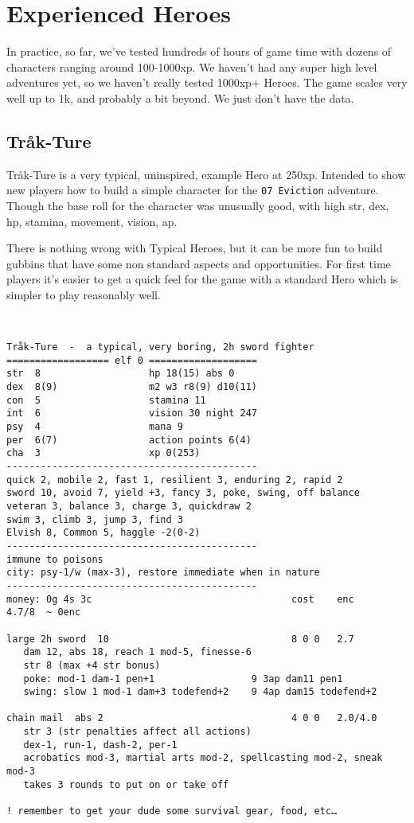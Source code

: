 \clearpage
{}
\section*{Experienced Heroes}
In practice, so far, we've tested hundreds of hours of game time with dozens of characters ranging around 100-1000xp. We haven't had any super high level adventures yet, so we haven't really tested 1000xp+ Heroes. The game scales very well up to 1k, and probably a bit beyond. We just don't have the data.


\subsection*{Tråk-Ture}
Tråk-Ture is a very typical, uninspired, example Hero at 250xp. Intended to show new players how to build a simple character for the \texttt{07 Eviction} adventure. Though the base roll for the character was unusually good, with high str, dex, hp, stamina, movement, vision, ap.

There is nothing wrong with Typical Heroes, but it can be more fun to build gubbins that have some non standard aspects and opportunities. For first time players it's easier to get a quick feel for the game with a standard Hero which is simpler to play reasonably well.

\

\small \begin{verbatim}
Tråk-Ture  -  a typical, very boring, 2h sword fighter
================== elf 0 ===================
str  8                   hp 18(15) abs 0
dex  8(9)                m2 w3 r8(9) d10(11)
con  5                   stamina 11
int  6                   vision 30 night 247
psy  4                   mana 9
per  6(7)                action points 6(4)
cha  3                   xp 0(253)
--------------------------------------------
quick 2, mobile 2, fast 1, resilient 3, enduring 2, rapid 2
sword 10, avoid 7, yield +3, fancy 3, poke, swing, off balance
veteran 3, balance 3, charge 3, quickdraw 2
swim 3, climb 3, jump 3, find 3
Elvish 8, Common 5, haggle -2(0-2)
--------------------------------------------
immune to poisons
city: psy-1/w (max-3), restore immediate when in nature
--------------------------------------------
money: 0g 4s 3c                                   cost    enc      4.7/8  ~ 0enc

large 2h sword  10                                8 0 0   2.7
   dam 12, abs 18, reach 1 mod-5, finesse-6
   str 8 (max +4 str bonus)
   poke: mod-1 dam-1 pen+1                 9 3ap dam11 pen1
   swing: slow 1 mod-1 dam+3 todefend+2    9 4ap dam15 todefend+2

chain mail  abs 2                                 4 0 0   2.0/4.0
   str 3 (str penalties affect all actions)
   dex-1, run-1, dash-2, per-1
   acrobatics mod-3, martial arts mod-2, spellcasting mod-2, sneak mod-3
   takes 3 rounds to put on or take off

! remember to get your dude some survival gear, food, etc…
\end{verbatim} \normalsize







